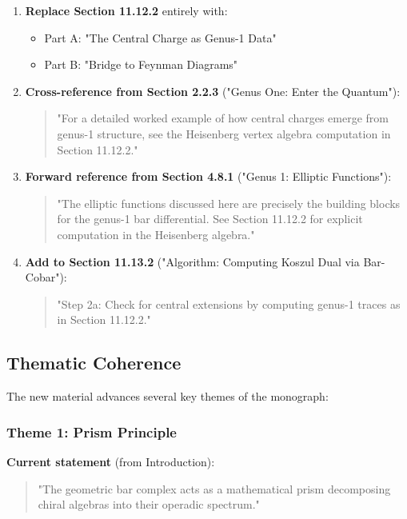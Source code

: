 \begin{enumerate}
\item \textbf{Replace Section 11.12.2} entirely with:
  \begin{itemize}
  \item Part A: "The Central Charge as Genus-1 Data"
  \item Part B: "Bridge to Feynman Diagrams"
  \end{itemize}

\item \textbf{Cross-reference from Section 2.2.3} ("Genus One: Enter the Quantum"):
  \begin{quote}
  "For a detailed worked example of how central charges emerge from genus-1 structure, see the Heisenberg vertex algebra computation in Section 11.12.2."
  \end{quote}

\item \textbf{Forward reference from Section 4.8.1} ("Genus 1: Elliptic Functions"):
  \begin{quote}
  "The elliptic functions discussed here are precisely the building blocks for the genus-1 bar differential. See Section 11.12.2 for explicit computation in the Heisenberg algebra."
  \end{quote}

\item \textbf{Add to Section 11.13.2} ("Algorithm: Computing Koszul Dual via Bar-Cobar"):
  \begin{quote}
  "Step 2a: Check for central extensions by computing genus-1 traces as in Section 11.12.2."
  \end{quote}
\end{enumerate}

\subsection{Thematic Coherence}

The new material advances several key themes of the monograph:

\subsubsection{Theme 1: Prism Principle}

\textbf{Current statement} (from Introduction):
\begin{quote}
"The geometric bar complex acts as a mathematical prism decomposing chiral algebras into their operadic spectrum."
\end{quote}

